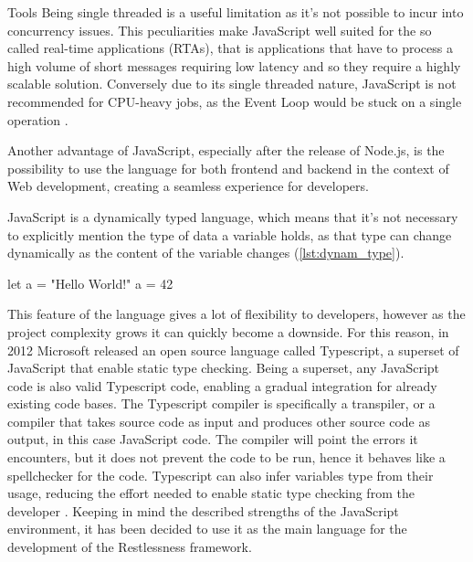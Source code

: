 \begin{chapter}{Tools}
    Being single threaded is a useful limitation as it's not possible to incur
    into concurrency issues.
    This peculiarities make JavaScript well suited for the so called real-time
    applications (RTAs), that is applications that have to process a high volume
    of short messages requiring low latency and so they require a highly scalable
    solution. Conversely due to its single threaded nature, JavaScript is not
    recommended for CPU-heavy jobs, as the Event Loop would be stuck on a single
    operation \cite{node_event_loop}\cite{node_on_backend}.

    Another advantage of JavaScript, especially after the release of Node.js, is
    the possibility to use the language for both frontend and backend in the context
    of Web development, creating a seamless experience for developers.

    JavaScript is a dynamically typed language, which means that it's not necessary
    to explicitly mention the type of data a variable holds, as that type can change
    dynamically as the content of the variable changes (\ref{lst:dynam_type}).

    \begin{code}[caption=Dynamically typed variables, label={lst:dynam_type}]
let a = "Hello World!"
a = 42
    \end{code}

    This feature of the language gives a lot of flexibility to developers, however
    as the project complexity grows it can quickly become a downside.
    For this reason, in 2012 Microsoft released an open source language called
    Typescript, a superset of JavaScript that enable static type checking.
    Being a superset, any JavaScript code is also valid Typescript code, enabling
    a gradual integration for already existing code bases.
    The Typescript compiler is specifically a transpiler, or a compiler that takes
    source code as input and produces other source code as output, in this case
    JavaScript code. The compiler will point the errors it encounters, but it does
    not prevent the code to be run, hence it behaves like a spellchecker for the code.
    Typescript can also infer variables type from their usage, reducing the effort
    needed to enable static type checking from the developer
    \cite{typescript_lang}\cite{typescript}.
    Keeping in mind the described strengths of the JavaScript environment, it has been
    decided to use it as the main language for the development of the Restlessness
    framework.


\end{chapter}
